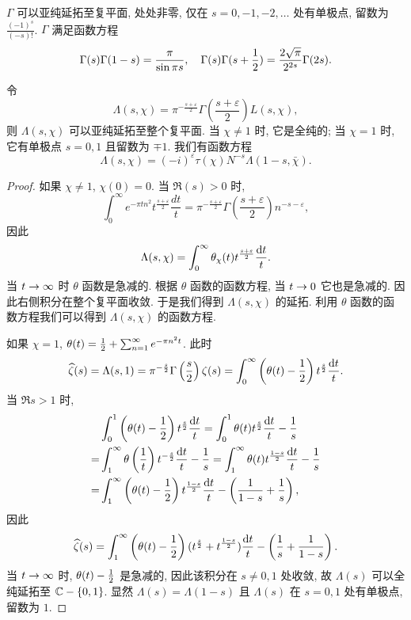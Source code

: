 \begin{proposition}{}{}
$\Gamma$ 可以亚纯延拓至复平面, 处处非零, 仅在 $s=0,-1,-2,\dots$ 处有单极点, 留数为 $\frac{(-1)^s}{(-s)!}$.
$\Gamma$ 满足函数方程 
  \[\Gamma(s)\Gamma(1-s)=\frac{\pi}{\sin \pi s},\quad \Gamma(s)\Gamma(s+\frac{1}{2})=\frac{2\sqrt{\pi}}{2^{2s}}\Gamma(2s).\]
\end{proposition}
\begin{theorem}{}{}
令
  \[\Lambda(s,\chi)=\pi^{-\frac{s+\varepsilon}{2}}\Gamma\left(\frac{s+\varepsilon}{2}\right)L(s,\chi),\]
则 $\Lambda(s,\chi)$ 可以亚纯延拓至整个复平面. 当 $\chi\neq 1$ 时, 它是全纯的; 当 $\chi=1$ 时, 它有单极点 $s=0,1$ 且留数为 $\mp1$. 我们有函数方程
  \[\Lambda(s,\chi)=(-i)^\varepsilon\tau(\chi)N^{-s}\Lambda(1-s,\bar\chi).\]
\end{theorem}
\begin{proof}
如果 $\chi\neq1$, $\chi(0)=0$.
当 $\Re(s)>0$ 时,
  \[\int_0^\infty e^{-\pi tn^2}t^{\frac{s+\varepsilon}{2}}\frac{dt}{t}
    =\pi^{-\frac{s+\varepsilon}{2}}\Gamma\left(\frac{s+\varepsilon}{2}\right)n^{-s-\varepsilon},\]
因此
  \[\Lambda(s,\chi)=\int_{0}^\infty \theta_\chi(t)t^{\frac{s+\varepsilon}{2}}\frac{\mathop{}\!\mathrm{d} t}{t}.\]
当 $t\rightarrow \infty$ 时 $\theta$ 函数是急减的. 根据 $\theta$ 函数的函数方程, 当 $t\rightarrow 0$ 它也是急减的. 因此右侧积分在整个复平面收敛. 
于是我们得到 $\Lambda(s,\chi)$ 的延拓. 利用 $\theta$ 函数的函数方程我们可以得到 $\Lambda(s,\chi)$ 的函数方程.

如果 $\chi=1$, $\theta(t)=\frac{1}{2}+\sum_{n=1}^\infty e^{-\pi n^2 t}$. 此时
  \[ \widehat\zeta(s)=\Lambda(s,1)=\pi^{-\frac{s}{2}}\Gamma\left(\frac{s}{2}\right)\zeta(s)
    =\int_0^\infty \left(\theta(t)-\frac{1}{2}\right)t^\frac{s}{2}\frac{\mathop{}\!\mathrm{d} t}{t}.\]
当 $\Re s>1$ 时,
  \[\begin{split}
    &\int_0^1\left(\theta(t)-\frac{1}{2}\right)t^{\frac{s}{2}}\frac{\mathop{}\!\mathrm{d} t}{t}
      =\int_0^1 \theta(t) t^\frac{s}{2}\frac{\mathop{}\!\mathrm{d} t}{t}-\frac{1}{s}\\
   =&\int_1^\infty \theta\left(\frac{1}{t}\right) t^{-\frac{s}{2}}\frac{\mathop{}\!\mathrm{d} t}{t}-\frac{1}{s}
      =\int_1^\infty \theta(t) t^{\frac{1-s}{2}}\frac{\mathop{}\!\mathrm{d} t}{t}-\frac{1}{s}\\
   =&\int_1^\infty\left(\theta(t)-\frac{1}{2}\right)t^{\frac{1-s}{2}}\frac{\mathop{}\!\mathrm{d} t}{t}-\left(\frac{1}{1-s}+\frac{1}{s}\right),
  \end{split}\]
因此
  \[\widehat\zeta(s)=\int_1^\infty\left(\theta(t)-\frac{1}{2}\right)(t^\frac{s}{2}+t^\frac{1-s}{2})\frac{\mathop{}\!\mathrm{d} t}{t}
    -\left(\frac{1}{s}+\frac{1}{1-s}\right).\]
当 $t\rightarrow \infty$ 时, $\theta(t)-\frac{1}{2}$ 是急减的, 因此该积分在 $s\neq 0,1$ 处收敛, 故 $\Lambda(s)$ 可以全纯延拓至 ${\mathbb{C}}-\left\{0,1\right\}$. 显然 $\Lambda(s)=\Lambda(1-s)$ 且 $\Lambda(s)$ 在 $s=0,1$ 处有单极点, 留数为 $1$.
\end{proof}

